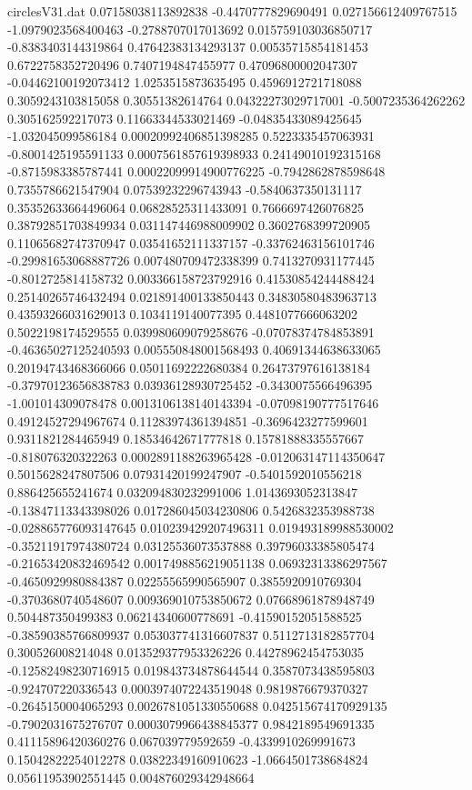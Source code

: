 \begin{filecontents}{circlesV31.dat}
0.07158038113892838	-0.4470777829690491	0.027156612409767515
-1.0979023568400463	-0.2788707017013692	0.015759103036850717
-0.8383403144319864	0.47642383134293137	0.00535715854181453
0.6722758352720496	0.7407194847455977	0.47096800002047307
-0.04462100192073412	1.0253515873635495	0.4596912721718088
0.3059243103815058	0.30551382614764	0.04322273029717001
-0.5007235364262262	0.305162592217073	0.11663344533021469
-0.04835433089425645	-1.032045099586184	0.00020992406851398285
0.5223335457063931	-0.8001425195591133	0.0007561857619398933
0.24149010192315168	-0.8715983385787441	0.00022099914900776225
-0.7942862878598648	0.7355786621547904	0.07539232296743943
-0.5840637350131117	0.35352633664496064	0.06828525311433091
0.7666697426076825	0.38792851703849934	0.031147446988009902
0.3602768399720905	0.11065682747370947	0.03541652111337157
-0.33762463156101746	-0.29981653068887726	0.007480709472338399
0.7413270931177445	-0.8012725814158732	0.003366158723792916
0.41530854244488424	0.25140265746432494	0.021891400133850443
0.34830580483963713	0.43593266031629013	0.1034119140077395
0.4481077666063202	0.5022198174529555	0.039980609079258676
-0.07078374784853891	-0.46365027125240593	0.005550848001568493
0.40691344638633065	0.20194743468366066	0.05011692222680384
0.26473797616138184	-0.37970123656838783	0.03936128930725452
-0.3430075566496395	-1.001014309078478	0.0013106138140143394
-0.07098190777517646	0.49124527294967674	0.11283974361394851
-0.3696423277599601	0.9311821284465949	0.18534642671777818
0.15781888335557667	-0.818076320322263	0.0002891188263965428
-0.012063147114350647	0.5015628247807506	0.07931420199247907
-0.5401592010556218	0.886425655241674	0.032094830232991006
1.0143693052313847	-0.13847113343398026	0.017286045034230806
0.5426832353988738	-0.028865776093147645	0.010239429207496311
0.019493189988530002	-0.35211917974380724	0.03125536073537888
0.39796033385805474	-0.21653420832469542	0.0017498856219051138
0.06932313386297567	-0.4650929980884387	0.02255565990565907
0.3855920910769304	-0.3703680740548607	0.009369010753850672
0.07668961878948749	0.504487350499383	0.06214340600778691
-0.41590152051588525	-0.38590385766809937	0.053037741316607837
0.5112713182857704	0.300526008214048	0.013529377953326226
0.44278962454753035	-0.12582498230716915	0.019843734878644544
0.3587073438595803	-0.924707220336543	0.0003974072243519048
0.9819876679370327	-0.2645150004065293	0.0026781051330550688
0.042515674170929135	-0.7902031675276707	0.0003079966438845377
0.9842189549691335	0.41115896420360276	0.067039779592659
-0.4339910269991673	0.15042822254012278	0.03822349160910623
-1.0664501738684824	0.05611953902551445	0.004876029342948664

\end{filecontents}
